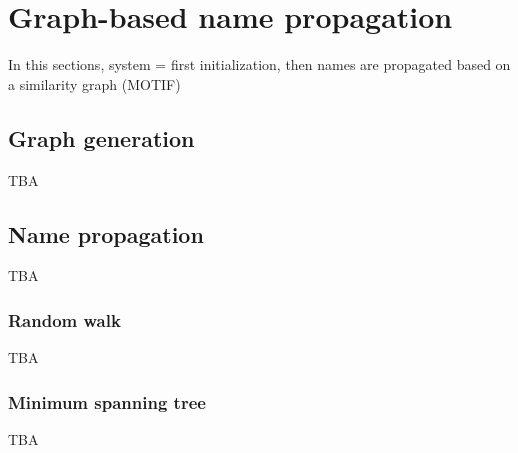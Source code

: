 \section{Graph-based name propagation}
\label{sec:graph}

In this sections, system = first initialization, then names are propagated based on a similarity graph (MOTIF)

\subsection{Graph generation}

TBA

\subsection{Name propagation}

TBA

\subsubsection{Random walk}

TBA

\subsubsection{Minimum spanning tree}

TBA

\endinput
